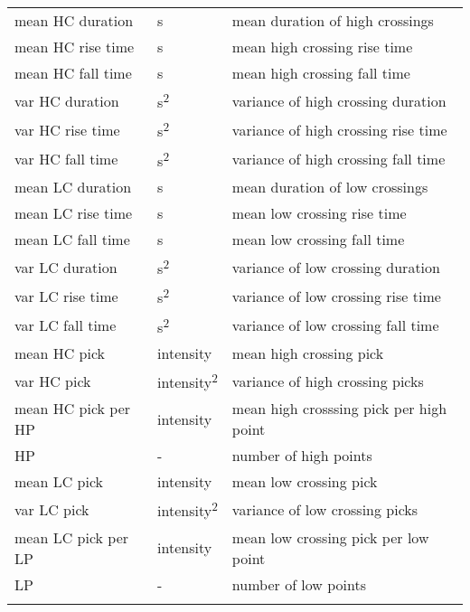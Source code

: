 \documentclass[10pt]{article}
\begin{document}
\begin{table}[h]
\begin{tabular}{lll}
    mean HC duration & \si{s} &  mean duration of high crossings \\
    \addlinespace[2pt]
    mean HC rise time & \si{s} &  mean high crossing rise time \\
    \addlinespace[2pt]
    mean HC fall time & \si{s} &  mean high crossing fall time \\
    \addlinespace[2pt]
    var HC duration & \si{s^2} &  variance of high crossing duration \\
    \addlinespace[2pt]
    var HC rise time & \si{s^2} &  variance of high crossing rise time \\
    \addlinespace[2pt]
    var HC fall time & \si{s^2} &  variance of high crossing fall time \\
    \addlinespace[2pt]
    mean LC duration & \si{s} &  mean duration of low crossings \\
    \addlinespace[2pt]
    mean LC rise time & \si{s} &  mean low crossing rise time \\
    \addlinespace[2pt]
    mean LC fall time & \si{s} &  mean low crossing fall time \\
    \addlinespace[2pt]
    var LC duration & \si{s^2} &  variance of low crossing duration \\
    \addlinespace[2pt]
    var LC rise time & \si{s^2} &  variance of low crossing rise time \\
    \addlinespace[2pt]
    var LC fall time & \si{s^2} &  variance of low crossing fall time \\
    \addlinespace[2pt]
    mean HC pick & intensity &  mean high crossing pick \\
    \addlinespace[2pt]
    var HC pick & intensity\textsuperscript{2} &  variance of high crossing picks \\
    \addlinespace[2pt]
    mean HC pick per HP & intensity &  mean high crosssing pick per high point \\
    \addlinespace[2pt]
    HP & - &  number of high points \\
    \addlinespace[2pt]
    mean LC pick & intensity &  mean low crossing pick \\
    \addlinespace[2pt]
    var LC pick & intensity\textsuperscript{2} &  variance of low crossing picks \\
    \addlinespace[2pt]
    mean LC pick per LP & intensity &  mean low crossing pick per low point \\
    \addlinespace[2pt]
    LP & - &  number of low points \\
    \addlinespace[2pt]

\end{tabular}
\end{table}
\end{document}
